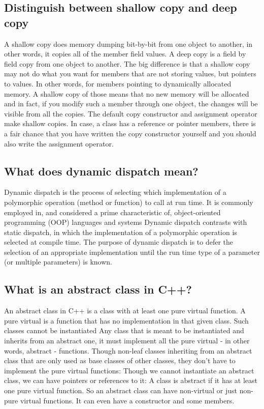 \documentclass{report}
\begin{document}
\pagebreak 
{}
\bigbreak \noindent 
\subsection{Distinguish between shallow copy and deep copy}
\bigbreak \noindent 
A shallow copy does memory dumping bit-by-bit from one object
to another, in other words, it copies all of the member field values.
A deep copy is a field by field copy from one object to another.
\bigbreak \noindent 
The big difference is that a shallow copy may not do what you
want for members that are not storing values, but pointers to values.
In other words, for members pointing to dynamically allocated
memory. A shallow copy of those means that no new memory will
be allocated and in fact, if you modify such a member through one
object, the changes will be visible from all the copies.
\bigbreak \noindent 
The default copy constructor and assignment operator make shallow copies. In case, a class has a reference or pointer members, there
is a fair chance that you have written the copy constructor yourself
and you should also write the assignment operator.

\bigbreak \noindent 
\subsection{What does dynamic dispatch mean?}
\bigbreak \noindent 
Dynamic dispatch is the process of selecting
which implementation of a polymorphic operation (method or
function) to call at run time. It is commonly employed in, and
considered a prime characteristic of, object-oriented programming
(OOP) languages and systems
\bigbreak \noindent 
Dynamic dispatch contrasts with static dispatch, in which the
implementation of a polymorphic operation is selected at compile
time. The purpose of dynamic dispatch is to defer the selection of an
appropriate implementation until the run time type of a parameter
(or multiple parameters) is known.

\bigbreak \noindent 
\subsection{What is an abstract class in C++?}
\bigbreak \noindent 
An abstract class in C++ is a class with at least one pure virtual
function. A pure virtual is a function that has no implementation
in that given class. Such classes cannot be instantiated
\bigbreak \noindent 
Any class that is meant to be instantiated and inherits from an
abstract one, it must implement all the pure virtual - in other words,
abstract - functions. Though non-leaf classes inheriting from an
abstract class that are only used as base classes of other classes,
they don’t have to implement the pure virtual functions: Though we cannot instantiate an abstract class, we can have
pointers or references to it:
\bigbreak \noindent 
A class is abstract if it has at least one pure virtual function. So
an abstract class can have non-virtual or just non-pure virtual
functions. It can even have a constructor and some members.
\end{document}
